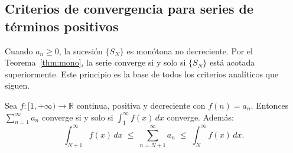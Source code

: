 \subsection{Criterios de convergencia para series de términos positivos}

Cuando $a_n \geq 0$, la sucesión $\{S_N\}$ es monótona no decreciente.
Por el Teorema~\ref{thm:mono}, la serie converge si y solo si $\{S_N\}$ está
acotada superiormente. Este principio es la base de todos los criterios
analíticos que siguen.


\begin{theorem}
Sea $f : [1,+\infty) \to \mathbb{R}$ continua, positiva y decreciente con
$f(n) = a_n$. Entonces $\displaystyle\sum_{n=1}^\infty a_n$ converge si y
solo si $\displaystyle\int_1^\infty f(x)\,dx$ converge. Además:
\[
  \int_{N+1}^\infty f(x)\,dx
  \;\leq\; \sum_{n=N+1}^\infty a_n
  \;\leq\; \int_N^\infty f(x)\,dx.
\]
\end{theorem}

